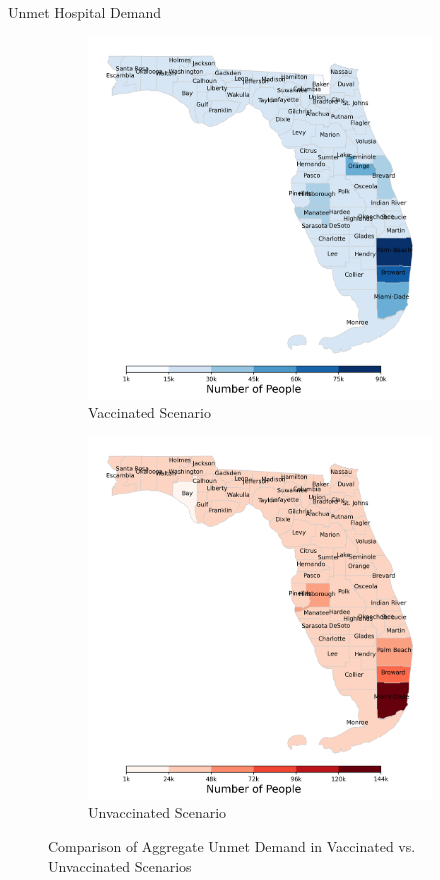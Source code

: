 \documentclass[aspectratio=169,xcolor=dvipsnames]{beamer}
\begin{document}
\begin{frame}{Unmet Hospital Demand}
    \begin{figure}
        \centering
        \begin{subfigure}{0.43\linewidth}
            \centering
            \includegraphics[width=0.85\linewidth]{pics/totalUnmetDemandVax0.1.png}
            \caption{Vaccinated Scenario}\label{fig:udHeatmapVax}
        \end{subfigure}
        \hspace{2em}
        \begin{subfigure}{0.43\linewidth}
            \centering
            \includegraphics[width=0.85\linewidth]{pics/totalUnmetDemandNoVax.png}
            \caption{Unvaccinated Scenario}\label{fig:udHeatmapNoVax}
        \end{subfigure}
        \caption{Comparison of Aggregate Unmet Demand in Vaccinated vs. Unvaccinated Scenarios}\label{fig:udHeatmap}
    \end{figure}
\end{frame}
\end{document}
